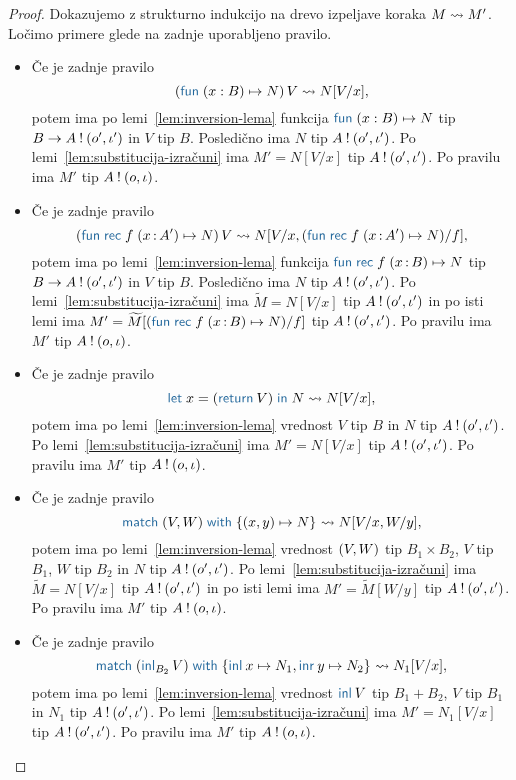 \begin{proof}
	Dokazujemo z strukturno indukcijo na drevo izpeljave koraka $M \leadsto M'$.
	Ločimo primere glede na zadnje uporabljeno pravilo.
	
	\begin{itemize}
		\item Če je zadnje pravilo $$\tmapp{(\tmfun{x : B}{N})}{V} \reduces N[V/x],$$ potem ima po lemi~\ref{lem:inversion-lema} funkcija $\tmfun{x : B}{N}$ tip $B \to A \mathbin{!} (o', \iota')$ in $V$ tip $B$. Posledično ima $N$ tip $A \mathbin{!} (o', \iota')$. Po lemi~\ref{lem:substitucija-izračuni} ima $M' = N[V/x]$ tip $A \mathbin{!} (o', \iota')$.
		Po pravilu  ima $M'$ tip $A \mathbin{!} (o, \iota)$.
		
		\item Če je zadnje pravilo $$\tmapp{(\tmfunrec{f}{x \of A'}{N})}{V} \reduces N[V/x, (\tmfunrec{f}{x \of A'}{N})/f],$$ potem ima po lemi~\ref{lem:inversion-lema} funkcija $\tmfunrec{f}{x \of B}{N}$ tip $B \to A \mathbin{!} (o', \iota')$ in $V$ tip $B$. Posledično ima $N$ tip $A \mathbin{!} (o', \iota')$. Po lemi~\ref{lem:substitucija-izračuni} ima $\widetilde{M} = N[V/x]$ tip $A \mathbin{!} (o', \iota')$ in po isti lemi ima $M' = \widetilde{M}[(\tmfunrec{f}{x \of B}{N})/f]$ tip $A \mathbin{!} (o', \iota')$.
		Po pravilu  ima $M'$ tip $A \mathbin{!} (o, \iota)$.
		
		\item Če je zadnje pravilo $$\tmlet{x}{(\tmreturn V)}{N} \reduces N[V/x],$$ potem ima po lemi~\ref{lem:inversion-lema} vrednost $V$ tip $B$ in $N$ tip $A \mathbin{!} (o', \iota')$.
		Po lemi~\ref{lem:substitucija-izračuni} ima $M' = N[V/x]$ tip $A \mathbin{!} (o', \iota')$.
		Po pravilu  ima $M'$ tip $A \mathbin{!} (o, \iota)$.
		
		\item Če je zadnje pravilo $$\tmmatch{\tmpair{V}{W}}{\tmpair{x}{y} \mapsto N} \reduces N[V/x, W/y],$$ potem ima po lemi~\ref{lem:inversion-lema} vrednost $( V , W )$ tip $B_1 \times B_2$, $V$ tip $B_1$, $W$ tip $B_2$ in $N$ tip $A \mathbin{!} (o', \iota')$. Po lemi~\ref{lem:substitucija-izračuni} ima $\widetilde{M} = N[V/x]$ tip $A \mathbin{!} (o', \iota')$ in po isti lemi ima $M' = \widetilde{M}[W/y]$ tip $A \mathbin{!} (o', \iota')$.
		Po pravilu  ima $M'$ tip $A \mathbin{!} (o, \iota)$.
		
		\item Če je zadnje pravilo $$\tmmatch{(\tminl[B_2]{V})}{\tminl{x} \mapsto N_1, \tminr{y} \mapsto N_2} \reduces N_1[V/x],$$ potem ima po lemi~\ref{lem:inversion-lema} vrednost $\tminl{V}$ tip $B_1 + B_2$, $V$ tip $B_1$ in $N_1$ tip $A \mathbin{!} (o', \iota')$.
		Po lemi~\ref{lem:substitucija-izračuni} ima $M' = N_1[V/x]$ tip $A \mathbin{!} (o', \iota')$.
		Po pravilu  ima $M'$ tip $A \mathbin{!} (o, \iota)$.
		

\end{itemize}
\end{proof}
